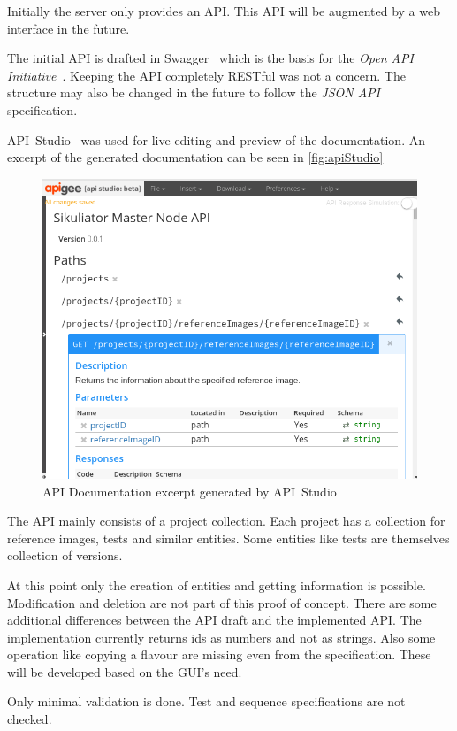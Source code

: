 \documentclass[a4paper,twocolumn,twoside]{article}
\begin{document}
Initially the server only provides an API.
This API will be augmented by a web interface in the future.

The initial API is drafted in Swagger~\cite{Swagger} which is the basis for the \emph{Open API Initiative}~\cite{OpenAPI}.
Keeping the API completely RESTful was not a concern.
The structure may also be changed in the future to follow the \emph{JSON API}~\cite{JSONAPI} specification.

API~Studio~\cite{ApiStudio} was used for live editing and preview of the documentation.
An excerpt of the generated documentation can be seen in \autoref{fig:apiStudio}

\begin{figure}[]
	\centering
	\includegraphics[width=0.8\linewidth]{../img/apiStudio}
	\caption{API Documentation excerpt generated by API~Studio}
	\label{fig:apiStudio}
\end{figure}

The API mainly consists of a project collection.
Each project has a collection for reference images, tests and similar entities.
Some entities like tests are themselves collection of versions.

At this point only the creation of entities and getting information is possible.
Modification and deletion are not part of this proof of concept.
There are some additional differences between the API draft and the implemented API.
The implementation currently returns ids as numbers and not as strings.
Also some operation like copying a flavour are missing even from the specification.
These will be developed based on the GUI's need.

Only minimal validation is done.
Test and sequence specifications are not checked.
\end{document}
